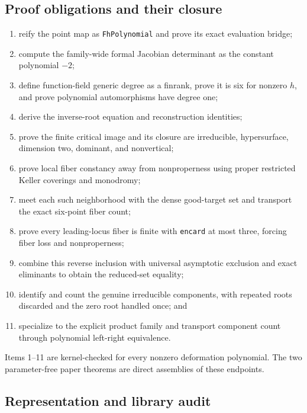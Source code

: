 \documentclass[11pt]{article}
\begin{document}
\subsection{Proof obligations and their closure}

\begin{enumerate}
 \item reify the point map as \texttt{FhPolynomial} and prove its exact
       evaluation bridge;
 \item compute the family-wide formal Jacobian determinant as the constant
       polynomial $-2$;
 \item define function-field generic degree as a finrank, prove it is six for
       nonzero $h$, and prove polynomial automorphisms have degree one;
 \item derive the inverse-root equation and reconstruction identities;
 \item prove the finite critical image and its closure are irreducible,
       hypersurface, dimension two, dominant, and nonvertical;
 \item prove local fiber constancy away from nonproperness using proper
       restricted Keller coverings and monodromy;
 \item meet each such neighborhood with the dense good-target set and transport
       the exact six-point fiber count;
 \item prove every leading-locus fiber is finite with \texttt{encard} at most
       three, forcing fiber loss and nonproperness;
 \item combine this reverse inclusion with universal asymptotic exclusion and
       exact eliminants to obtain the reduced-set equality;
 \item identify and count the genuine irreducible components, with repeated
       roots discarded and the zero root handled once; and
 \item specialize to the explicit product family and transport component count
       through polynomial left-right equivalence.
\end{enumerate}

Items 1--11 are kernel-checked for every nonzero deformation polynomial.  The
two parameter-free paper theorems are direct assemblies of these endpoints.

\subsection{Representation and library audit}
\end{document}
